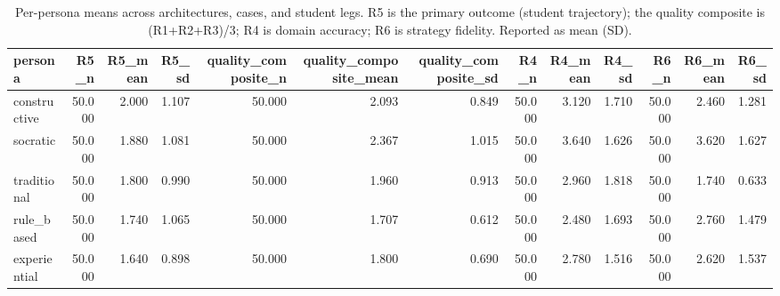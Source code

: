 \begin{table}[htbp]
\centering
\caption{Per-persona means across architectures, cases, and student legs. R5 is the primary outcome (student trajectory); the quality composite is (R1+R2+R3)/3; R4 is domain accuracy; R6 is strategy fidelity. Reported as mean (SD).}
\label{tab:per-persona-means}
\begin{tabular}{lrrrrrrrrrrrr}
\toprule
persona & R5\_n & R5\_mean & R5\_sd & quality\_composite\_n & quality\_composite\_mean & quality\_composite\_sd & R4\_n & R4\_mean & R4\_sd & R6\_n & R6\_mean & R6\_sd \\
\midrule
constructive & 50.000 & 2.000 & 1.107 & 50.000 & 2.093 & 0.849 & 50.000 & 3.120 & 1.710 & 50.000 & 2.460 & 1.281 \\
socratic & 50.000 & 1.880 & 1.081 & 50.000 & 2.367 & 1.015 & 50.000 & 3.640 & 1.626 & 50.000 & 3.620 & 1.627 \\
traditional & 50.000 & 1.800 & 0.990 & 50.000 & 1.960 & 0.913 & 50.000 & 2.960 & 1.818 & 50.000 & 1.740 & 0.633 \\
rule\_based & 50.000 & 1.740 & 1.065 & 50.000 & 1.707 & 0.612 & 50.000 & 2.480 & 1.693 & 50.000 & 2.760 & 1.479 \\
experiential & 50.000 & 1.640 & 0.898 & 50.000 & 1.800 & 0.690 & 50.000 & 2.780 & 1.516 & 50.000 & 2.620 & 1.537 \\
\bottomrule
\end{tabular}
\end{table}
